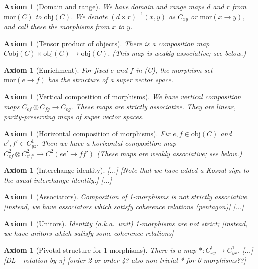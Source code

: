 \documentclass[12pt,a4paper]{article}
\newtheorem{axiom}[theorem]{Axiom}
\newcommand{\mor}{\text{mor}}
\newcommand{\obj}{\text{obj}}
\newcommand{\ot}{\otimes}
\newcommand{\nn}[1]{{\color{kwcolor}[#1]}}
\begin{document}
\begin{axiom}[Domain and range]
We have domain and range maps $d$ and $r$ from $\mor(C)$ to $\obj(C)$.
We denote $(d \times r)^{-1}(x, y)$ as $C_{xy}$ or $\mor(x \to y)$, and call these
the morphisms from $x$ to $y$.
\end{axiom}

\begin{axiom}[Tensor product of objects]
There is a composition map $C\obj(C) \times \obj(C) \to \obj(C)$.
(This map is weakly associative; see below.)
\end{axiom}

\begin{axiom}[Enrichment]
For fixed $e$ and $f$ in \obj(C), the morphism set $\mor(e\to f)$ has the structure of a super vector space.
\end{axiom}

\begin{axiom}[Vertical composition of morphisms]
We have vertical composition maps $C_{ef} \ot C_{fg} \to C_{eg}$.
These maps are strictly associative.
They are linear, parity-preserving maps of super vector spaces.
\end{axiom}

\begin{axiom}[Horizontal composition of morphisms]
Fix $e, f \in \obj(C)$ and $e',f'\in C^1_{yz}$.
Then we have a horizontal composition map $C^2_{ef} \ot C^2_{e'f'} \to C^2(ee' \to ff')$
(These maps are weakly associative; see below.)
\end{axiom}

\begin{axiom}[Interchange identity]
\nn{...}
\nn{Note that we have added a Koszul sign to the usual interchange identity.}
\nn{...}
\end{axiom}

\begin{axiom}[Associators]
Composition of 1-morphisms is not strictly associative.
\nn{instead, we have associators which satisfy coherence relations (pentagon)}
\nn{...}\end{axiom}

\begin{axiom}[Unitors]
Identity (a.k.a.\ unit) 1-morphisms are not strict;
\nn{instead, we have unitors which satisfy some coherence relations}
\end{axiom}

\begin{axiom}[Pivotal structure for 1-morphisms]
There is a map $*:C^1_{xy} \to C^1_{yx}$.
\nn{...}
\nn{DL - rotation by $\pi$}
\nn{order 2 or order 4?  also non-trivial * for 0-morphisms??}
\end{axiom}
\end{document}
